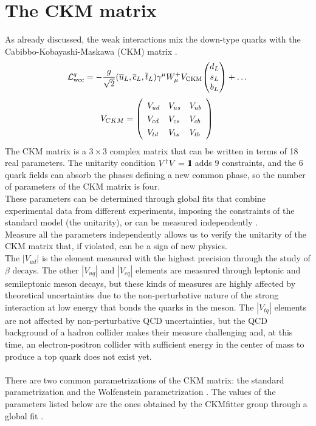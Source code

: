 \section{The CKM matrix}\label{sec:CKM}
As already discussed, the weak interactions mix the down-type quarks with the Cabibbo-Kobayashi-Maskawa (CKM) matrix \cite{Cabibbo_angle,Kobayashi1973CP-ViolationInteraction}.
\begin{equation}
    \Lg{wcc}^q=-\frac{g}{\sqrt{2}}(\overline{{{u}}}_{L},\overline{{{c}}}_{L},\overline{{{t}}}_{L})\gamma^{\mu}W_{\mu}^{+}V_{\mathrm{CKM}}\tb{d_{L}}{s_{L}}{b_L}+\dots
\end{equation}
\begin{equation}
V_{C K M}=\left(\begin{array}{l l l}{{V_{u d}}}&{{V_{u s}}}&{{V_{u b}}}\\ {{V_{c d}}}&{{V_{c s}}}&{{V_{c b}}}\\ {{V_{t d}}}&{{V_{t s}}}&{{V_{t b}}}\end{array}\right)\,
\end{equation}
The CKM matrix is a $3 \times 3$ complex matrix that can be written in terms of 18 real parameters. The unitarity condition $V^\dagger V= 1\kern-0.25em\text{l}$ adds 9 constraints, and the 6 quark fields can absorb the phases defining a new common phase, so the number of parameters of the CKM matrix is four.\\
These parameters can be determined through global fits that combine experimental data from different experiments, imposing the constraints of the standard model (\eg the unitarity), or can be measured independently \cite{PDG_2022}.\\
Measure all the parameters independently allows us to verify the unitarity of the CKM matrix that, if violated, can be a sign of new physics.\\
The $|V_{ud}|$ is the element measured with the highest precision through the study of $\beta$ decays. The other $|V_{uq}|$ and $|V_{cq}|$ elements are measured through leptonic and semileptonic meson decays, but these kinds of measures are highly affected by theoretical uncertainties due to the non-perturbative nature of the strong interaction at low energy that bonds the quarks in the meson.
The $|V_{tq}|$ elements are not affected by non-perturbative QCD uncertainties, but the QCD background of a hadron collider makes their measure challenging and, at this time, an electron-positron collider with sufficient energy in the center of mass to produce a top quark does not exist yet.
\\
\\
There are two common parametrizations of the CKM matrix: the standard parametrization and the Wolfenstein parametrization \cite{PDG_2022}.
The values of the parameters listed below are the ones obtained by the CKMfitter group through a global fit \cite{Charles2005CPFactories,Hocker2001AMatrix,PDG_2022}.
